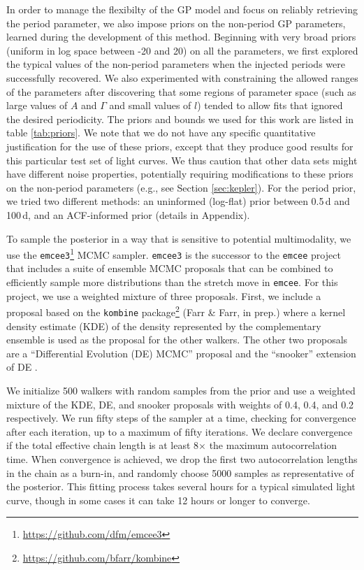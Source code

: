 \documentclass[useAMS, usenatbib, preprint, 12pt]{aastex}
\begin{document}
In order to manage the flexibilty of the GP model and focus on reliably
retrieving the period parameter, we also impose priors on the non-period GP
parameters, learned during the development of this method.
Beginning with very broad priors (uniform in log space between -20 and 20) on
all the parameters, we first explored the typical values of the non-period
parameters when the injected periods were successfully recovered.
We also experimented with constraining the allowed ranges of the parameters
after discovering that some regions of parameter space (such as large values
of $A$ and $\Gamma$ and small values of $l$) tended to allow fits that ignored
the desired periodicity.
The priors and bounds we used for this work are listed in table
\ref{tab:priors}.
We note that we do not have any specific quantitative justification for the
use of these priors, except that they produce good results for this particular
test set of light curves.
We thus caution that other data sets might have different noise properties,
potentially requiring modifications to these priors on the non-period
parameters (e.g., see Section \ref{sec:kepler}).
For the period prior, we tried two different methods: an uninformed (log-flat)
prior between 0.5\,d and 100\,d, and an ACF-informed prior (details in
Appendix).

To sample the posterior in a way that is sensitive to potential multimodality,
we use the \texttt{emcee3}\footnote{\url{https://github.com/dfm/emcee3}} MCMC
sampler.
\texttt{emcee3} is the successor to the \texttt{emcee} project
\citep{Foreman-Mackey2013} that includes a suite of ensemble MCMC proposals
that can be combined to efficiently sample more distributions than the stretch
move \citep{Goodman2010} in \texttt{emcee}.
For this project, we use a weighted mixture of three proposals.
First, we include a proposal based on the \texttt{kombine}
package\footnote{\url{https://github.com/bfarr/kombine}} (Farr \& Farr, in
prep.) where a kernel density estimate (KDE) of the density represented by the
complementary ensemble is used as the proposal for the other walkers.
The other two proposals are a ``Differential Evolution (DE) MCMC'' proposal
\citep{terBraak2006, Nelson2014} and the ``snooker'' extension of DE
\citep{terBraak2008}.

We initialize 500 walkers with random samples from the prior and use a
weighted mixture of the KDE, DE, and snooker proposals with weights of 0.4,
0.4, and 0.2 respectively.
We run fifty steps of the sampler at a time, checking for convergence after
each iteration, up to a maximum of fifty iterations.
We declare convergence if the total effective chain length is at least
8$\times$ the maximum autocorrelation time.
When convergence is achieved, we drop the first two autocorrelation lengths in
the chain as a burn-in, and randomly choose 5000 samples as representative of
the posterior.
This fitting process takes several hours for a typical simulated light curve,
though in some cases it can take 12 hours or longer to converge.
\end{document}
